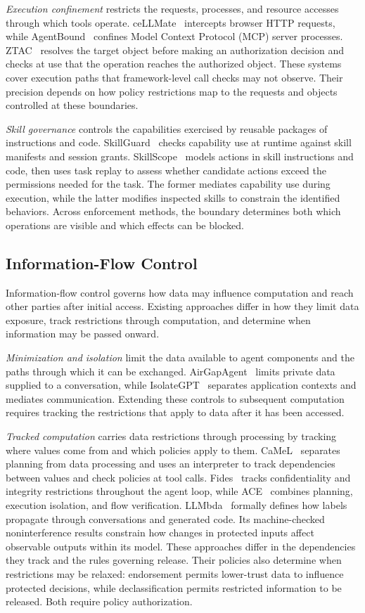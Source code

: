 \emph{Execution confinement} restricts the requests, processes, and resource accesses through which tools operate. ceLLMate~\cite{cellmate} intercepts browser HTTP requests, while AgentBound~\cite{agentbound} confines Model Context Protocol (MCP) server processes. ZTAC~\cite{ztac} resolves the target object before making an authorization decision and checks at use that the operation reaches the authorized object. These systems cover execution paths that framework-level call checks may not observe. Their precision depends on how policy restrictions map to the requests and objects controlled at these boundaries.

\emph{Skill governance} controls the capabilities exercised by reusable packages of instructions and code. SkillGuard~\cite{skillguard} checks capability use at runtime against skill manifests and session grants. SkillScope~\cite{skillscope} models actions in skill instructions and code, then uses task replay to assess whether candidate actions exceed the permissions needed for the task. The former mediates capability use during execution, while the latter modifies inspected skills to constrain the identified behaviors. Across enforcement methods, the boundary determines both which operations are visible and which effects can be blocked.

\subsection{Information-Flow Control}
Information-flow control governs how data may influence computation and reach other parties after initial access. Existing approaches differ in how they limit data exposure, track restrictions through computation, and determine when information may be passed onward.

\emph{Minimization and isolation} limit the data available to agent components and the paths through which it can be exchanged. AirGapAgent~\cite{airgap} limits private data supplied to a conversation, while IsolateGPT~\cite{isolate} separates application contexts and mediates communication. Extending these controls to subsequent computation requires tracking the restrictions that apply to data after it has been accessed.

\emph{Tracked computation} carries data restrictions through processing by tracking where values come from and which policies apply to them. CaMeL~\cite{camel} separates planning from data processing and uses an interpreter to track dependencies between values and check policies at tool calls. Fides~\cite{fides} tracks confidentiality and integrity restrictions throughout the agent loop, while ACE~\cite{ace} combines planning, execution isolation, and flow verification. LLMbda~\cite{llmbda} formally defines how labels propagate through conversations and generated code. Its machine-checked noninterference results constrain how changes in protected inputs affect observable outputs within its model. These approaches differ in the dependencies they track and the rules governing release. Their policies also determine when restrictions may be relaxed: endorsement permits lower-trust data to influence protected decisions, while declassification permits restricted information to be released. Both require policy authorization.

